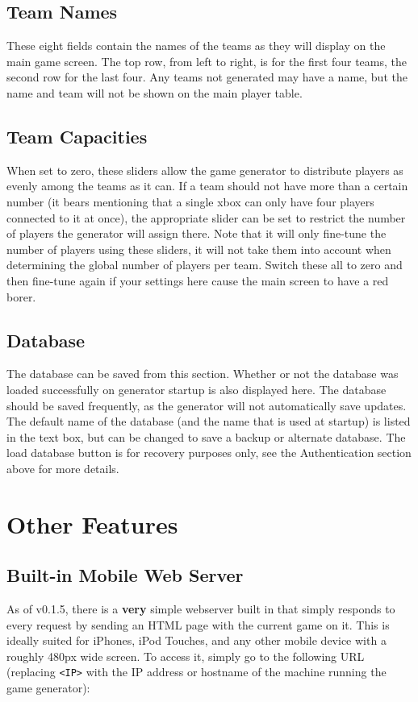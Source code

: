 \documentclass[10pt,a4paper]{report}
\begin{document}
\section{Team Names}
These eight fields contain the names of the teams as they will display on the main game screen.  The top row, from left to right, is for the first four teams, the second row for the last four.  Any teams not generated may have a name, but the name and team will not be shown on the main player table.

\section{Team Capacities}
When set to zero, these sliders allow the game generator to distribute players as evenly among the teams as it can.  If a team should not have more than a certain number (it bears mentioning that a single xbox can only have four players connected to it at once), the appropriate slider can be set to restrict the number of players the generator will assign there.  Note that it will only fine-tune the number of players using these sliders, it will not take them into account when determining the global number of players per team.  Switch these all to zero and then fine-tune again if your settings here cause the main screen to have a red borer.

\section{Database}
The database can be saved from this section.  Whether or not the database was loaded successfully on generator startup is also displayed here.  The database should be saved frequently, as the generator will not automatically save updates.  The default name of the database (and the name that is used at startup) is listed in the text box, but can be changed to save a backup or alternate database.  The load database button is for recovery purposes only, see the Authentication section above for more details.

\chapter{Other Features}
\section{Built-in Mobile Web Server}
As of v0.1.5, there is a \textbf{very} simple webserver built in that simply responds to every request by sending an HTML page with the current game on it.  This is ideally suited for iPhones, iPod Touches, and any other mobile device with a roughly 480px wide screen.  To access it, simply go to the following URL (replacing \verb+<IP>+ with the IP address or hostname of the machine running the game generator):
\end{document}
